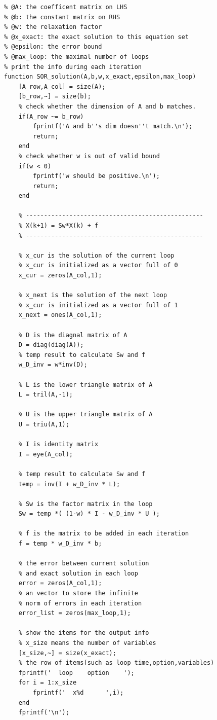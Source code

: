 \documentclass[12pt,a4paper,utf8]{ctexart}
\begin{document}
\begin{enumerate}
\begin{itemize}
\begin{lstlisting}[frame=single]
% implementing SOR iteration
% @A: the coefficent matrix on LHS
% @b: the constant matrix on RHS
% @w: the relaxation factor
% @x_exact: the exact solution to this equation set
% @epsilon: the error bound
% @max_loop: the maximal number of loops
% print the info during each iteration
function SOR_solution(A,b,w,x_exact,epsilon,max_loop)
    [A_row,A_col] = size(A);
    [b_row,~] = size(b);
    % check whether the dimension of A and b matches.
    if(A_row ~= b_row)
        fprintf('A and b''s dim doesn''t match.\n');
        return;
    end
    % check whether w is out of valid bound
    if(w < 0)
        fprintf('w should be positive.\n');
        return;
    end
    
    % -------------------------------------------------
    % X(k+1) = Sw*X(k) + f
    % -------------------------------------------------
    
    % x_cur is the solution of the current loop
    % x_cur is initialized as a vector full of 0
    x_cur = zeros(A_col,1);
    
    % x_next is the solution of the next loop
    % x_cur is initialized as a vector full of 1
    x_next = ones(A_col,1);
    
    % D is the diagnal matrix of A
    D = diag(diag(A));
    % temp result to calculate Sw and f
    w_D_inv = w*inv(D);
    
    % L is the lower triangle matrix of A
    L = tril(A,-1);
    
    % U is the upper triangle matrix of A
    U = triu(A,1);
    
    % I is identity matrix
    I = eye(A_col);
    
    % temp result to calculate Sw and f
    temp = inv(I + w_D_inv * L);
    
    % Sw is the factor matrix in the loop
    Sw = temp *( (1-w) * I - w_D_inv * U );
    
    % f is the matrix to be added in each iteration
    f = temp * w_D_inv * b;
    
    % the error between current solution 
    % and exact solution in each loop
    error = zeros(A_col,1);
    % an vector to store the infinite 
    % norm of errors in each iteration
    error_list = zeros(max_loop,1);
    
    % show the items for the output info
    % x_size means the number of variables
    [x_size,~] = size(x_exact);
    % the row of items(such as loop time,option,variables)
    fprintf('  loop    option    ');
    for i = 1:x_size
        fprintf('  x%d      ',i);
    end
    fprintf('\n');
    

\end{lstlisting}
\end{itemize}
\end{enumerate}
\end{document}
